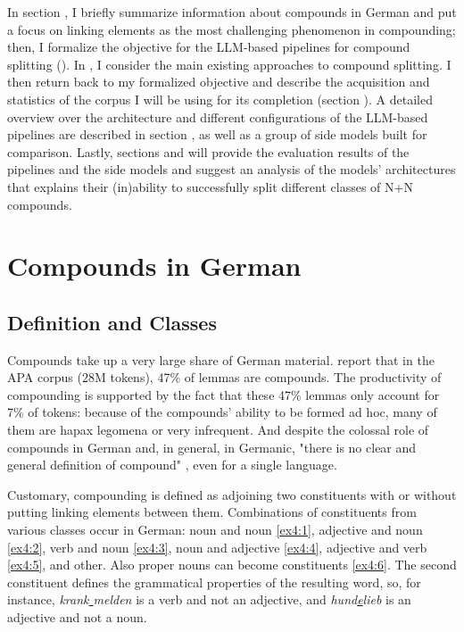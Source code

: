 \documentclass[11pt]{article}
\begin{document}
In section , I briefly summarize information about compounds in German and put a focus on linking elements as the most challenging phenomenon in compounding; then, I formalize the objective for the LLM-based pipelines for compound splitting (). In , I consider the main existing approaches to compound splitting. I then return back to my formalized objective and describe the acquisition and statistics of the corpus I will be using for its completion (section ). A detailed overview over the architecture and different configurations of the LLM-based pipelines are described in section , as well as a group of side models built for comparison. Lastly, sections  and  will provide the evaluation results of the pipelines and the side models and suggest an analysis of the models' architectures that explains their (in)ability to successfully split different classes of N+N compounds.


\section{Compounds in German}
\label{sec:comps}

\subsection{Definition and Classes}

Compounds take up a very large share of German material. \citet{baroni:2003} report that in the APA corpus (28M tokens), 47\% of lemmas are compounds. The productivity of compounding is supported by the fact that these 47\% lemmas only account for 7\% of tokens: because of the compounds' ability to be formed ad hoc, many of them are hapax legomena or very infrequent. And despite the colossal role of compounds in German and, in general, in Germanic, "there is no clear and general definition of compound" \cite{Schlucker2022}, even for a single language.

Customary, compounding is defined as adjoining two constituents with or without putting linking elements between them. Combinations of constituents from various classes occur in German: noun and noun \ref{ex4:1},
adjective and noun \ref{ex4:2}, verb and noun \ref{ex4:3}, noun and adjective \ref{ex4:4}, adjective and verb \ref{ex4:5}, and other. Also proper nouns can become constituents \ref{ex4:6}.
The second constituent defines the grammatical properties of the resulting word, so, for instance, \textit{krank\underline{ }melden} is a verb and not an adjective, and \textit{hund\underline{e}lieb} is an adjective and not a noun.
\end{document}

